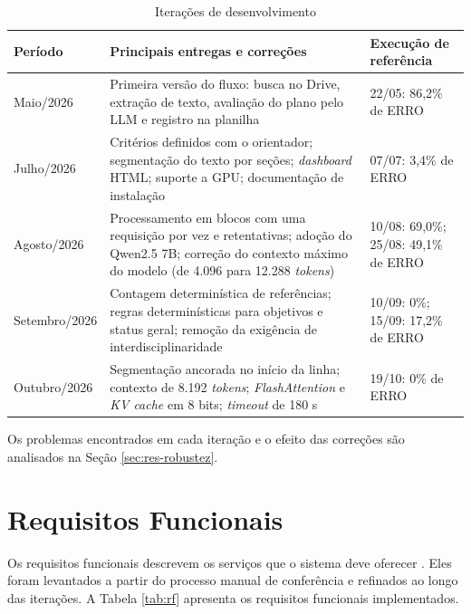 \begin{table}[H]
\centering
\caption{Iterações de desenvolvimento}
\label{tab:iteracoes}
\footnotesize
\begin{tabular}{@{}L{2.2cm}L{9.3cm}L{2.9cm}@{}}
\toprule
{}
\textbf{Período} & \textbf{Principais entregas e correções} & \textbf{Execução de referência} \\ \midrule
Maio/2026 & Primeira versão do fluxo: busca no Drive, extração de texto, avaliação do plano pelo LLM e registro na planilha & 22/05: 86,2\% de ERRO \\
Julho/2026 & Critérios definidos com o orientador; segmentação do texto por seções; \textit{dashboard} HTML; suporte a GPU; documentação de instalação & 07/07: 3,4\% de ERRO \\
Agosto/2026 & Processamento em blocos com uma requisição por vez e retentativas; adoção do Qwen2.5 7B; correção do contexto máximo do modelo (de 4.096 para 12.288 \textit{tokens}) & 10/08: 69,0\%; 25/08: 49,1\% de ERRO \\
Setembro/2026 & Contagem determinística de referências; regras determinísticas para objetivos e status geral; remoção da exigência de interdisciplinaridade & 10/09: 0\%; 15/09: 17,2\% de ERRO \\
Outubro/2026 & Segmentação ancorada no início da linha; contexto de 8.192 \textit{tokens}; \textit{FlashAttention} e \textit{KV cache} em 8 bits; \textit{timeout} de 180 s & 19/10: 0\% de ERRO \\ \bottomrule
\end{tabular}
\end{table}

Os problemas encontrados em cada iteração e o efeito das correções são analisados na Seção \ref{sec:res-robustez}.

\section{Requisitos Funcionais}
\label{sec:rf}

Os requisitos funcionais descrevem os serviços que o sistema deve oferecer \cite{Sommerville2016}. Eles foram levantados a partir do processo manual de conferência e refinados ao longo das iterações. A Tabela \ref{tab:rf} apresenta os requisitos funcionais implementados.

